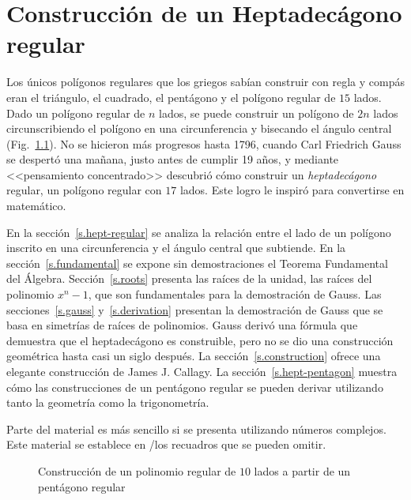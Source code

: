 
\chapter{Construcción de un Heptadecágono regular}\label{c.heptadecagon}


Los únicos polígonos regulares que los griegos sabían construir con regla y compás eran el triángulo, el cuadrado, el pentágono y el polígono regular de $15$ lados. Dado un polígono regular de $n$ lados, se puede construir un polígono de $2n$ lados circunscribiendo el polígono en una circunferencia y bisecando el ángulo central (Fig.~\ref{f.hept-double}). No se hicieron más progresos hasta 1796, cuando Carl Friedrich Gauss se despertó una mañana, justo antes de cumplir 19 años, y mediante <<pensamiento concentrado>> descubrió cómo construir un \emph{heptadecágono} regular, un polígono regular con $17$ lados. Este logro le inspiró para convertirse en matemático.

En la sección~\ref{s.hept-regular} se analiza la relación entre el lado de un polígono inscrito en una circunferencia y el ángulo central que subtiende. En la sección~\ref{s.fundamental} se expone sin demostraciones el Teorema Fundamental del Álgebra. Sección~\ref{s.roots} presenta las raíces de la unidad, las raíces del polinomio $x^n-1$, que son fundamentales para la demostración de Gauss. Las secciones~\ref{s.gauss} y~\ref{s.derivation} presentan la demostración de Gauss que se basa en simetrías de raíces de polinomios. Gauss derivó una fórmula que demuestra que el heptadecágono es construible, pero no se dio una construcción geométrica hasta casi un siglo después. La sección~\ref{s.construction} ofrece una elegante construcción de James J. Callagy. La sección~\ref{s.hept-pentagon} muestra cómo las construcciones de un pentágono regular se pueden derivar utilizando tanto la geometría como la trigonometría.

Parte del material es más sencillo si se presenta utilizando números complejos. Este material se establece en /los recuadros que se pueden omitir.
\begin{figure}[b]
\begin{center}
\end{center}
\caption{Construcción de un polinomio regular de $10$ lados a partir de un pentágono regular}\label{f.hept-double}
\end{figure}

